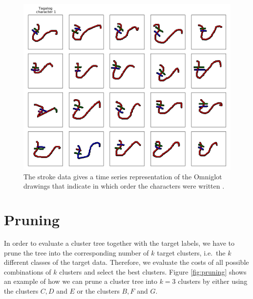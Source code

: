 \begin{figure}[h]
  \centering
  \includegraphics[width=.6\textwidth]{plots/demo_strokes}
  \caption{The stroke data gives a time series representation of the Omniglot drawings that indicate in which order the characters were written \cite{Lake1332}.}
  \label{fig:omniglotstroke}
\end{figure}

\section{Pruning}

In order to evaluate a cluster tree together with the target labels, we have to prune the tree into the corresponding number of $k$ target clusters, i.e.\ the $k$ different classes of the target data. Therefore, we evaluate the costs of all possible combinations of $k$ clusters and select the best clusters. Figure \ref{fig:pruning} shows an example of how we can prune a cluster tree into $k = 3$ clusters by either using the clusters $C, D$ and $E$ or the clusters $B, F$ and $G$.

